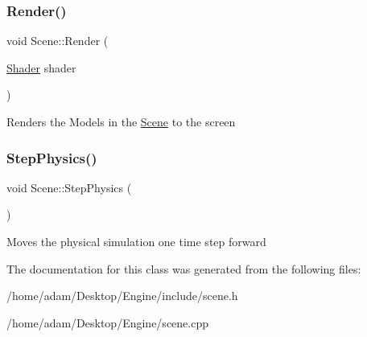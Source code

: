 \subsubsection{\texorpdfstring{Render()}{Render()}}
{\footnotesize\ttfamily void Scene\+::\+Render (\begin{DoxyParamCaption}\item[{\hyperlink{classShader}{Shader}}]{shader }\end{DoxyParamCaption})}

Renders the Models in the \hyperlink{classScene}{Scene} to the screen \mbox{\label{classScene_a5fe443641612290ba78931132d1fddb5}} 
\subsubsection{\texorpdfstring{Step\+Physics()}{StepPhysics()}}
{\footnotesize\ttfamily void Scene\+::\+Step\+Physics (\begin{DoxyParamCaption}{ }\end{DoxyParamCaption})}

Moves the physical simulation one time step forward 

The documentation for this class was generated from the following files\+:\begin{DoxyCompactItemize}
\item 
/home/adam/\+Desktop/\+Engine/include/scene.\+h\item 
/home/adam/\+Desktop/\+Engine/scene.\+cpp\end{DoxyCompactItemize}
